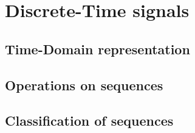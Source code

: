 \documentclass[../../main/main.tex]{subfiles}
\begin{document}
\chapter{Discrete-Time signals}


\section{Time-Domain representation}





\section{Operations on sequences}





\section{Classification of sequences}
\end{document}

